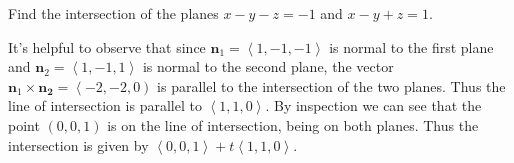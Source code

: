 \documentclass[answers,12pt,addpoints]{exam}
\begin{document}
\begin{questions}
\question[25] Find the intersection of the planes
$x-y-z=-1$ and $x-y+z=1$.
\begin{solution}[1in]
It's helpful to observe that since
$\mathbold{n}_1=\left\langle 1,-1,-1\right\rangle$
is normal to the first plane and
$\mathbold{n}_2=\left\langle 1,-1,1\right\rangle$
is normal to the second plane,
the vector $\mathbold{n}_1\times\mathbold{n_2}
=\left\langle -2,-2,0\right)$ is parallel to the
intersection of the two planes.
Thus the line of intersection is parallel
to $\left\langle 1,1,0\right\rangle$.
By inspection we can see that the point $\left(0,0,1\right)$
is on the line of intersection, being on both planes.
Thus the intersection is given by
$\left\langle 0,0,1\right\rangle
+t\left\langle 1,1,0\right\rangle$.

\end{solution}

\end{questions}
\end{document}
